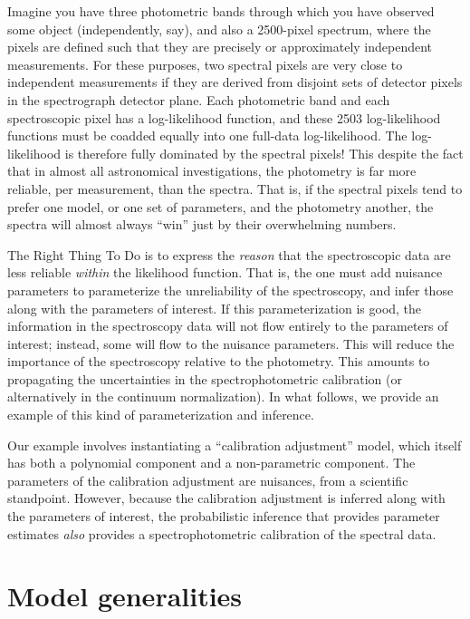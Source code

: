 \documentclass[iop,numberedappendix]{emulateapj}
\begin{document}
Imagine you have three photometric bands through which you have
observed some object (independently, say), and also a 2500-pixel
spectrum, where the pixels are defined such that they are precisely or
approximately independent measurements.
For these purposes, two spectral pixels are very close to independent
measurements if they are derived from disjoint sets of detector pixels
in the spectrograph detector plane.
Each photometric band and each spectroscopic pixel has a
log-likelihood function, and these 2503 log-likelihood functions must
be coadded equally into one full-data
log-likelihood.
The log-likelihood is therefore fully dominated by the spectral
pixels!
This despite the fact that in almost all astronomical investigations,
the photometry is far more reliable, per measurement, than the
spectra.
That is, if the spectral pixels tend to prefer one model, or one set
of parameters, and the photometry another, the spectra will almost
always ``win'' just by their overwhelming numbers.

The Right Thing To Do is to express the \emph{reason} that the
spectroscopic data are less reliable \emph{within} the
likelihood function.
That is, the one must add nuisance parameters to parameterize the
unreliability of the spectroscopy, and infer those along with the
parameters of interest.
If this parameterization is good, the information in the spectroscopy
data will not flow entirely to the parameters of interest; instead,
some will flow to the nuisance parameters.
This will reduce the importance of the spectroscopy relative to the
photometry.
This amounts to propagating the uncertainties in the
spectrophotometric calibration (or alternatively in the continuum
normalization).
In what follows, we provide an example of this kind of
parameterization and inference.

Our example involves instantiating a ``calibration adjustment'' model,
which itself has both a polynomial component and a non-parametric
component.
The parameters of the calibration adjustment are nuisances, from a
scientific standpoint.
However, because the calibration adjustment is inferred along with the
parameters of interest, the probabilistic inference that provides
parameter estimates \emph{also} provides a spectrophotometric
calibration of the spectral data.


\section{Model generalities}
\end{document}

